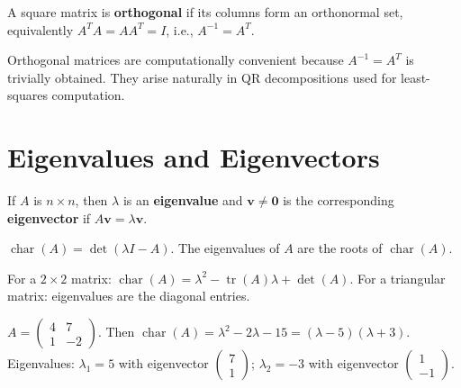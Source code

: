 \begin{definition}
A square matrix is \textbf{orthogonal} if its columns form an orthonormal set, equivalently $A^T A = AA^T = I$, i.e., $A^{-1}=A^T$.
\end{definition}

\begin{remark}
Orthogonal matrices are computationally convenient because $A^{-1}=A^T$ is trivially obtained. They arise naturally in QR decompositions used for least-squares computation.
\end{remark}

\section{Eigenvalues and Eigenvectors}

\begin{definition}
If $A$ is $n\times n$, then $\lambda$ is an \textbf{eigenvalue} and $\mathbf{v}\neq\mathbf{0}$ is the corresponding \textbf{eigenvector} if $A\mathbf{v}=\lambda\mathbf{v}$.
\end{definition}

\begin{definition}
$\operatorname{char}(A) = \det(\lambda I - A)$. The eigenvalues of $A$ are the roots of $\operatorname{char}(A)$.
\end{definition}

\begin{fact}
For a $2\times2$ matrix: $\operatorname{char}(A) = \lambda^2 - \operatorname{tr}(A)\lambda + \det(A)$.
For a triangular matrix: eigenvalues are the diagonal entries.
\end{fact}

\begin{example}
$A=\begin{pmatrix}4&7\\1&-2\end{pmatrix}$. Then $\operatorname{char}(A)=\lambda^2-2\lambda-15=(\lambda-5)(\lambda+3)$. Eigenvalues: $\lambda_1=5$ with eigenvector $\begin{pmatrix}7\\1\end{pmatrix}$; $\lambda_2=-3$ with eigenvector $\begin{pmatrix}1\\-1\end{pmatrix}$.
\end{example}

